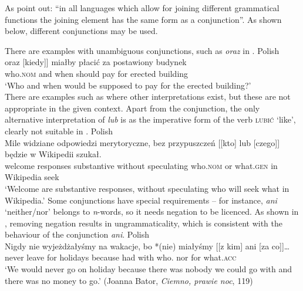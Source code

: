 \documentclass[output=paper]{../langscibook}
\begin{document}
As \citet[28]{pat:prz:19:syntaxfest} point out: ``in all languages
which allow for joining different grammatical functions the joining
element has the same form as a conjunction''.  As shown below, different
conjunctions may be used.

There are examples with unambiguous conjunctions, such as \emph{oraz}
in .
\ea\label{ex:Patejuk2015:5.10}
    Polish\\\gll
      [[kto] oraz [kiedy]] miałby płacić za postawiony budynek \\
      \phtm{[[}who.\textsc{nom} and \phtm{[}when should pay for erected building\\
\glt`Who and when would be supposed to pay for the erected building?'\\\hspace*{\fill}\nkjp
\z
There are examples such as  where other
interpretations exist, but these are not
appropriate in the given context. Apart from the conjunction, the
only alternative interpretation of \emph{lub} is as the imperative
form of the verb \textsc{lubi\'c} `like', clearly not suitable in .
\ea\label{ex:Patejuk2015:5.15}
    Polish\\\gll
      {Mile widziane} odpowiedzi merytoryczne, bez przypuszczeń [[kto] lub
      [czego]] będzie w Wikipedii szukał. \\
      welcome responses substantive without speculating \phtm{[[}who.\textsc{nom} or \phtm{[}what.\textsc{gen} \AUX{} in Wikipedia seek\\
\glt`Welcome are substantive responses, without speculating who will seek what in Wikipedia.'\nkjp
\z
Some conjunctions have special requirements – for instance, \emph{ani} `neither/nor'
belongs to \emph{n}-words, so it needs negation to be licenced. As
shown in , removing negation results in
ungrammaticality, which is consistent with the behaviour of the
conjunction \emph{ani}.
\newpage
\ea\label{ex:Patejuk2015:5.12}
    Polish\\\gll
      Nigdy nie wyjeżdżałyśmy na wakacje, bo *(nie) miałyśmy [[z kim] ani [za
      co]]… \\
      never \NEG{} leave for holidays because \phtm{*(}\NEG{} had \phtm{[[}with
      who.{\INS} nor \phtm{[}for what.\textsc{acc}\\
\glt`We would never go on holiday because there was nobody we could go
    with and there was no money to go.' \hfill (Joanna Bator, \emph{Ciemno, prawie noc}, 119)
\end{document}
